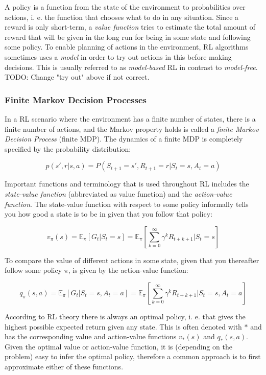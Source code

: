 A policy is a function from the state of the environment to probabilities over
actions, i. e.  the function that chooses what to do in any situation. Since a
reward is only short-term, a \textit{value function} tries to estimate the
total amount of reward that will be given in the long run for being in some
state and following some policy. To enable planning of actions in the
environment, RL algorithms sometimes uses a \textit{model} in order to try out
actions in this before making decisions. This is usually referred to as
\textit{model-based} RL in contrast to \textit{model-free}. TODO: Change "try
out" above if not correct.

\subsubsection{Finite Markov Decision Processes}

In a RL scenario where the environment has a finite number of states, there is
a finite number of actions, and the Markov property holds is called a
\textit{finite Markov Decision Process} (finite MDP). The dynamics of a finite MDP is completely specified by the
probability distribution:

\begin{equation}
    p(s', r|s, a) = P(S_{t+1} = s', R_{t+1} = r | S_t = s, A_t = a)
\end{equation}

Important functions and terminology that is used throughout RL includes the \textit{state-value function} (abbreviated as value function) and
the \textit{action-value function}. The state-value function with respect to some policy informally tells you
how good a state is to be in given that you follow that policy:

\begin{equation}
    v_\pi(s) = \mathbb{E}_\pi\left[G_t|S_t=s\right] = \mathbb{E}_\pi\left[\sum_{k=0}^\infty \gamma^k R_{t+k+1}|S_t=s\right]
\end{equation}

To compare the value of different actions in some state, given that you thereafter follow some policy $\pi$,
is given by the action-value function:

\begin{equation}
    q_\pi(s, a) = \mathbb{E}_\pi\left[G_t|S_t=s,A_t=a\right] = \mathbb{E}_\pi\left[\sum_{k=0}^\infty \gamma^k R_{t+k+1}|S_t=s,A_t=a\right]
\end{equation}

According to RL theory there is always an optimal policy, i. e. that gives the
highest possible expected return given any state. This is often denoted with
$*$ and has the corresponding value and action-value functions $v_*(s)$ and
$q_*(s, a)$. Given the optimal value or action-value function, it is (depending
on the problem) easy to infer the optimal policy, therefore a common approach
is to first approximate either of these functions.

